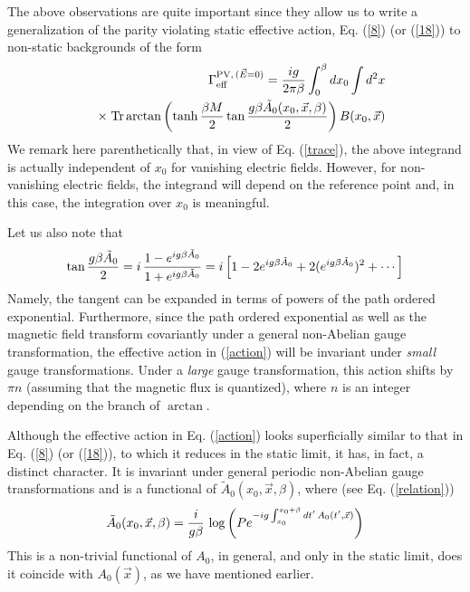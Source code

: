 \documentclass[a4paper,12pt]{article}
\begin{document}
The above observations are quite important since they allow us to write a
generalization of the parity violating static effective action,
Eq. (\ref{8}) (or (\ref{18})) to non-static backgrounds of the form
\begin{eqnarray}
&  & \Gamma_{\rm eff}^{{\rm PV},\,(\vec{E}=0)}  =  
{ig\over 2\pi\beta}
\int_{0}^{\beta} dx_{0}\int d^{2}x\nonumber \\ 
&  & \times\; {\rm Tr} \arctan\left(\tanh
  {\beta M\over 2} \tan {g\beta
    \tilde{A}_{0}(x_{0},\vec{x},\beta)\over 2}\right)
B(x_{0},\vec{x})\label{action}
\end{eqnarray}
We remark here parenthetically that, in view of Eq. (\ref{trace}), the
above integrand is actually independent of $x_{0}$ for vanishing
electric fields. However, for non-vanishing electric fields, the
integrand will depend on the reference point and, in this case,  the
integration over $x_{0}$ is meaningful.

Let us also note that
\begin{equation}
\tan {g\beta \tilde{A}_{0}\over 2} = i\,{1-e^{ig\beta \tilde{A}_{0}}\over
  1+ e^{ig\beta \tilde{A}_{0}}} = i\left[1 - 2
  e^{ig\beta\tilde{A}_{0}} + 2 (e^{ig\beta \tilde{A}_{0}})^{2} + \cdots \right]
\end{equation}
Namely, the tangent can be expanded in terms of powers of the path
ordered exponential. Furthermore, since the path ordered exponential
as well as the magnetic field transform covariantly under a general
non-Abelian gauge transformation, the effective action in
(\ref{action}) will be invariant under {\it small} gauge
transformations. Under a {\it large} gauge transformation, this action
shifts by $\pi n$ (assuming that the magnetic flux is quantized),
where $n$ is an integer depending on the branch of $\arctan$.

Although the effective action in Eq. (\ref{action}) looks superficially similar
to that in Eq. (\ref{8}) (or (\ref{18})), to which it reduces in the
static limit, it has, in fact, a distinct character. It is invariant
under  general periodic non-Abelian gauge transformations and is a
functional of $\tilde{A}_{0}(x_{0},\vec{x},\beta)$, where (see
Eq. (\ref{relation}))
\begin{equation}
\tilde{A}_{0}(x_{0},\vec{x},\beta) =  {i\over g\beta}\,\log \left(P
  e^{-ig\int_{x_{0}}^{x_{0}+\beta} dt'\,A_{0}(t',\vec{x})}\right)
\end{equation}
This is a non-trivial functional of $A_{0}$, in general, and only
in the static limit, does it coincide with $A_{0}(\vec{x})$, as we
have mentioned earlier.
\end{document}
